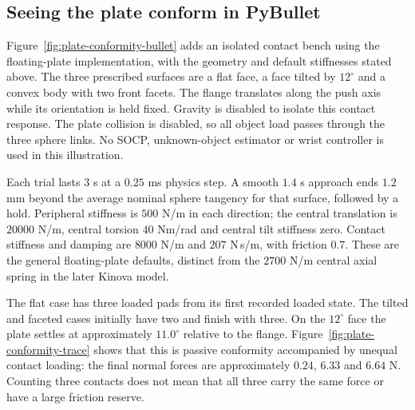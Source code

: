 \subsection{Seeing the plate conform in PyBullet}
\label{sec:plate-visual-bench}

Figure~\ref{fig:plate-conformity-bullet} adds an isolated contact bench using the floating-plate implementation, with the geometry and default stiffnesses stated above. The three prescribed surfaces are a flat face, a face tilted by $12^\circ$ and a convex body with two front facets. The flange translates along the push axis while its orientation is held fixed. Gravity is disabled to isolate this contact response. The plate collision is disabled, so all object load passes through the three sphere links. No SOCP, unknown-object estimator or wrist controller is used in this illustration.


Each trial lasts $3$ s at a $0.25$ ms physics step. A smooth $1.4$ s approach ends $1.2$ mm beyond the average nominal sphere tangency for that surface, followed by a hold. Peripheral stiffness is $500$ N/m in each direction; the central translation is $20000$ N/m, central torsion $40$ Nm/rad and central tilt stiffness zero. Contact stiffness and damping are $8000$ N/m and $207$ N\,s/m, with friction $0.7$. These are the general floating-plate defaults, distinct from the $2700$ N/m central axial spring in the later Kinova model.

The flat case has three loaded pads from its first recorded loaded state. The tilted and faceted cases initially have two and finish with three. On the $12^\circ$ face the plate settles at approximately $11.0^\circ$ relative to the flange. Figure~\ref{fig:plate-conformity-trace} shows that this is passive conformity accompanied by unequal contact loading: the final normal forces are approximately $0.24$, $6.33$ and $6.64$ N. Counting three contacts does not mean that all three carry the same force or have a large friction reserve.

